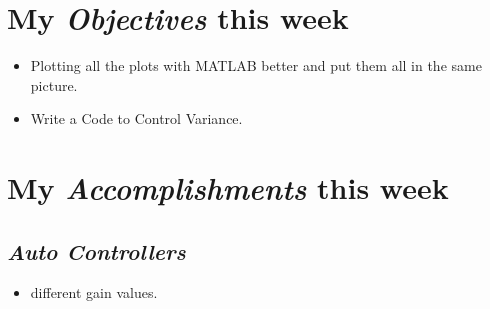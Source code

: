 \newcommand{\handoutName}{Weekly report}
\newcommand{\handoutdate}{Nov 25, 2014}
\newcommand{\duedate}{}


\section{My \emph{Objectives} this week}
\begin{itemize}
\item Plotting all the plots with MATLAB better and put them all in the same picture.
\item Write a Code to Control Variance.
\end{itemize}


\section{My \emph{Accomplishments} this week}

\subsection{\emph{Auto Controllers}}

\begin{itemize}
\item different gain values.
\end{itemize}




